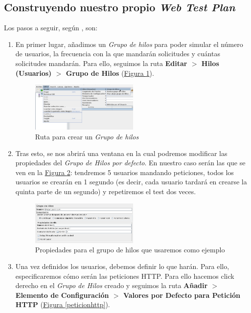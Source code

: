 \documentclass[10pt,a4paper,spanish]{article}
\numberwithin{equation}{section} %
\numberwithin{figure}{section} %
\numberwithin{table}{section} %
\begin{document}
\subsection{Construyendo nuestro propio \textit{Web Test Plan}}
Los pasos a seguir, según \cite{apachetuto}, son:
\begin{enumerate}[1.]
    \item En primer lugar, añadimos un \textit{Grupo de hilos} para poder simular el número de usuarios, la frecuencia con la que mandarán solicitudes y cuántas solicitudes mandarán. Para ello, seguimos la ruta \textbf{Editar $>$ Hilos (Usuarios) $>$ Grupo de Hilos} (\hyperref[grupohilos]{Figura \ref*{grupohilos}}).

    \begin{figure}[!h]
        \centering
        \includegraphics[width=0.5\textwidth]{10}
        \caption{Ruta para crear un \textit{Grupo de hilos}}
        \label{grupohilos}
    \end{figure}

    \item Tras esto, se nos abrirá una ventana en la cual podremos modificar las propiedades del \textit{Grupo de Hilos por defecto}. En nuestro caso serán las que se ven en la \hyperref[grupohilospro]{Figura \ref*{grupohilospro}}: tendremos 5 usuarios mandando peticiones, todos los usuarios se crearán en 1 segundo (es decir, cada usuario tardará en crearse la quinta parte de un segundo) y repetiremos el test dos veces.

    \begin{figure}[!h]
        \centering
        \includegraphics[width=0.5\textwidth]{11}
        \caption{Propiedades para el grupo de hilos que usaremos como ejemplo}
        \label{grupohilospro}
    \end{figure}

    \item Una vez definidos los usuarios, debemos definir lo que harán. Para ello, especificaremos cómo serán las peticiones HTTP. Para ello hacemos click derecho en el \textit{Grupo de Hilos} creado y seguimos la ruta \textbf{Añadir $>$ Elemento de Configuración $>$ Valores por Defecto para Petición HTTP} (\hyperref[peticionhttp]{Figura \ref*{peticionhttp}}).


\end{enumerate}
\end{document}
